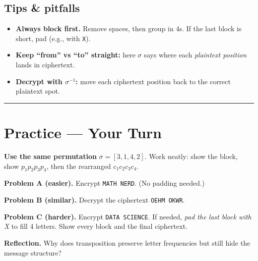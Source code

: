 \documentclass[12pt]{article}
\newcommand{\workbox}[1]{\fbox{\parbox{\dimexpr\textwidth-2\fboxsep-2\fboxrule\relax}{\vspace{#1}}}}
\begin{document}
\subsection*{Tips \& pitfalls}
\begin{itemize}[leftmargin=1.25em]
  \item \textbf{Always block first.} Remove spaces, then group in 4s. If the last block is short, pad (e.g., with \texttt{X}).
  \item \textbf{Keep “from” vs “to” straight:} here \(\sigma\) says where each \emph{plaintext position} lands in ciphertext.
  \item \textbf{Decrypt with \(\sigma^{-1}\):} move each ciphertext position back to the correct plaintext spot.
\end{itemize}

\bigskip
\hrule
\vspace{0.5em}

\section*{Practice — Your Turn}

\textbf{Use the same permutation } \(\sigma=[3,1,4,2]\). Work neatly: show the block, show \(p_1p_2p_3p_4\), then the rearranged \(c_1c_2c_3c_4\).

\textbf{Problem A (easier).} Encrypt \texttt{MATH NERD}. (No padding needed.)
\workbox{2.2cm}

\textbf{Problem B (similar).} Decrypt the ciphertext \texttt{OEHM OKWR}.
\workbox{2.2cm}

\textbf{Problem C (harder).} Encrypt \texttt{DATA SCIENCE}. If needed, \emph{pad the last block with X} to fill 4 letters. Show every block and the final ciphertext.
\workbox{3.0cm}

\bigskip
\textbf{Reflection.} Why does transposition preserve letter frequencies but still hide the message structure?
\workbox{1.4cm}
\end{document}
